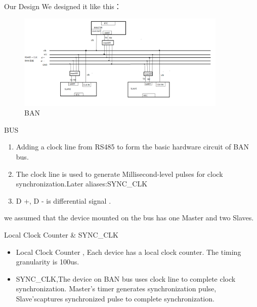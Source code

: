 \begin{frame}[fragile]{Our Design}
We designed it like this：
\begin{figure}[htbp]
\begin{center}
\includegraphics[width=10cm]{img/overview}
\caption{BAN }
\label{Overview}
\end{center}
\vspace{-0.5em}
\end{figure}
\end{frame}





\begin{frame}[fragile]{BUS}

\begin{enumerate}
\item Adding a clock line from RS485 to form the basic hardware circuit of BAN bus.
\item The clock  line is used to generate Millisecond-level pulses for clock synchronization.Later aliases:SYNC\_CLK
\item D +, D - is  differential  signal  .

\end{enumerate}

we assumed that the device mounted on the bus has one Master and two Slaves.


\end{frame}

\begin{frame}[fragile]{Local Clock Counter \& SYNC\_CLK}

\begin{itemize}
\item  Local Clock Counter , Each device has a local clock counter. The timing granularity is 100us.

\item  SYNC\_CLK,The device on BAN bus uses clock line to complete clock synchronization. Master's timer generates synchronization pulse, Slave'scaptures synchronized  pulse to complete synchronization.
\end{itemize}


\end{frame}





